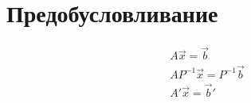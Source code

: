 \section{Предобусловливание}
\begin{gather*}
  A \vec{x} = \vec{b} \\
  A P^{-1} \vec{x} = P^{-1}\vec{b} \\
  A' \vec{x} = \vec{b}' 
\end{gather*}